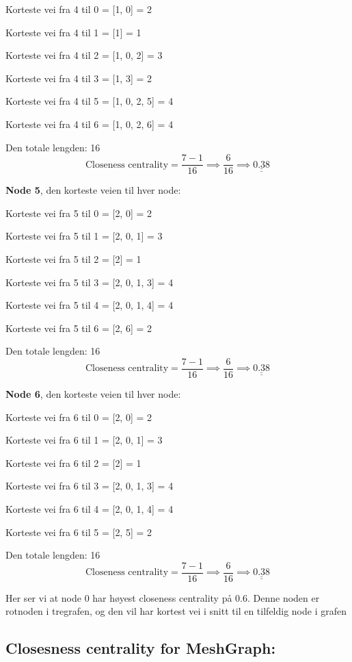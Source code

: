 \documentclass[11pt]{article}
\begin{document}
Korteste vei fra 4 til 0 = {[}1, 0{]} = 2

Korteste vei fra 4 til 1 = {[}1{]} = 1

Korteste vei fra 4 til 2 = {[}1, 0, 2{]} = 3

Korteste vei fra 4 til 3 = {[}1, 3{]} = 2

Korteste vei fra 4 til 5 = {[}1, 0, 2, 5{]} = 4

Korteste vei fra 4 til 6 = {[}1, 0, 2, 6{]} = 4

Den totale lengden: 16
\[\text{Closeness centrality} = \frac{7 - 1}{16} \implies \frac{6}{16} \implies\underline{\underline{ 0.38 }}\]

\textbf{Node 5}, den korteste veien til hver node:

Korteste vei fra 5 til 0 = {[}2, 0{]} = 2

Korteste vei fra 5 til 1 = {[}2, 0, 1{]} = 3

Korteste vei fra 5 til 2 = {[}2{]} = 1

Korteste vei fra 5 til 3 = {[}2, 0, 1, 3{]} = 4

Korteste vei fra 5 til 4 = {[}2, 0, 1, 4{]} = 4

Korteste vei fra 5 til 6 = {[}2, 6{]} = 2

Den totale lengden: 16
\[\text{Closeness centrality} = \frac{7 - 1}{16} \implies \frac{6}{16} \implies\underline{\underline{ 0.38 }}\]

\textbf{Node 6}, den korteste veien til hver node:

Korteste vei fra 6 til 0 = {[}2, 0{]} = 2

Korteste vei fra 6 til 1 = {[}2, 0, 1{]} = 3

Korteste vei fra 6 til 2 = {[}2{]} = 1

Korteste vei fra 6 til 3 = {[}2, 0, 1, 3{]} = 4

Korteste vei fra 6 til 4 = {[}2, 0, 1, 4{]} = 4

Korteste vei fra 6 til 5 = {[}2, 5{]} = 2

Den totale lengden: 16
\[\text{Closeness centrality} = \frac{7 - 1}{16} \implies \frac{6}{16} \implies\underline{\underline{ 0.38 }}\]

Her ser vi at node 0 har høyest closeness centrality på 0.6. Denne noden
er rotnoden i tregrafen, og den vil har kortest vei i snitt til en
tilfeldig node i grafen

    \hypertarget{closesness-centrality-for-meshgraph}{%
\subsection*{Closesness centrality for
MeshGraph:}\label{closesness-centrality-for-meshgraph}}
\end{document}
